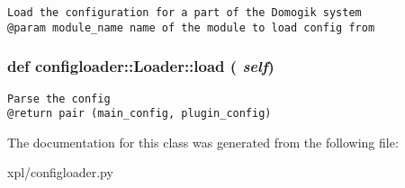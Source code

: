 \footnotesize\begin{verbatim}
Load the configuration for a part of the Domogik system
@param module_name name of the module to load config from
\end{verbatim}
\normalsize
 \hypertarget{classconfigloader_1_1Loader_52f1433b0ea290e45661b7473c3a68d4}{
\subsubsection[load]{\setlength{\rightskip}{0pt plus 5cm}def configloader::Loader::load ( {\em self})}}
\label{classconfigloader_1_1Loader_52f1433b0ea290e45661b7473c3a68d4}




\footnotesize\begin{verbatim}
Parse the config
@return pair (main_config, plugin_config)
\end{verbatim}
\normalsize
 

The documentation for this class was generated from the following file:\begin{CompactItemize}
\item 
xpl/configloader.py\end{CompactItemize}
